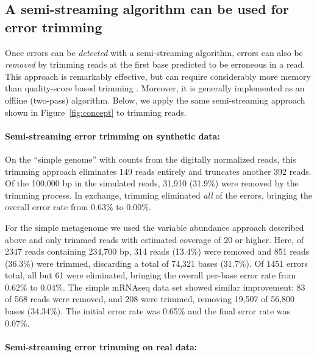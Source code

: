 \documentclass{article}
\begin{document}
\subsection{A semi-streaming algorithm can be used for error trimming}

Once errors can be {\em detected} with a semi-streaming algorithm, errors
can also be {\em removed} by trimming reads at the first base
predicted to be erroneous in a read.  This approach is remarkably
effective, but can require considerably more memory than quality-score
based trimming \cite{Zhang2014}.  Moreover, it is generally
implemented as an offline (two-pass) algorithm.  Below, we apply the same
semi-streaming approach shown in Figure~\ref{fig:concept} to trimming
reads.



\paragraph{Semi-streaming error trimming on synthetic data:}

On the ``simple genome'' with counts from the digitally normalized
reads, this trimming approach eliminates 149 reads entirely and
truncates another 392 reads.  Of the 100,000 bp in the simulated
reads, 31,910 (31.9\%) were removed by the trimming process.  In
exchange, trimming eliminated {\em all} of the errors, bringing the
overall error rate from 0.63\% to 0.00\%.


For the simple metagenome we used the variable abundance approach
described above and only trimmed reads with estimated coverage of 20
or higher.  Here, of 2347 reads containing 234,700 bp, 314 reads
(13.4\%) were removed and 851 reads (36.3\%) were trimmed, discarding
a total of 74,321 bases (31.7\%).  Of 1451 errors total, all but 61
were eliminated, bringing the overall per-base error rate from 0.62\% to
0.04\%.  The simple mRNAseq data set showed similar improvement: 83 of
568 reads were removed, and 208 were trimmed, removing 19,507 of
56,800 bases (34.34\%).  The initial error rate was 0.65\% and the
final error rate was 0.07\%.
\paragraph{Semi-streaming error trimming on real data:}
\end{document}
